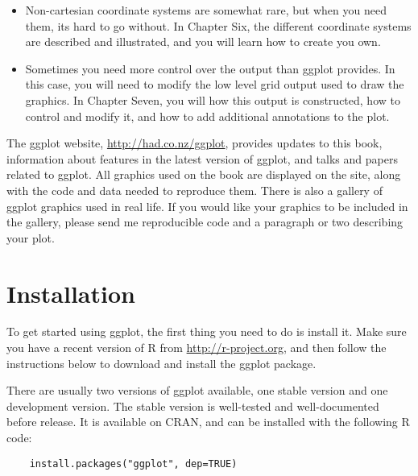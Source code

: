 \begin{itemize}
	\item Non-cartesian coordinate systems are somewhat rare, but when you need them, its hard to go without.  In Chapter Six, the different coordinate systems are described and illustrated, and you will learn how to create you own.
	
	
	\item Sometimes you need more control over the output than ggplot provides.  In this case, you will need to modify the low level grid output used to draw the graphics.  In Chapter Seven, you will how this output is constructed, how to control and modify it, and how to add additional annotations to the plot.

\end{itemize}

The ggplot website, \url{http://had.co.nz/ggplot}, provides updates to this book, information about features in the latest version of ggplot, and talks and papers related to ggplot.  All graphics used on the book are displayed on the site, along with the code and data needed to reproduce them.  There is also a gallery of ggplot graphics used in real life.  If you would like your graphics to be included in the gallery, please send me reproducible code and a paragraph or two describing your plot.

\section{Installation}\label{sub:installation}

To get started using ggplot, the first thing you need to do is install it.  Make sure you have a recent version of R from \url{http://r-project.org}, and then follow the instructions below to download and install the ggplot package.  

There are usually two versions of ggplot available, one stable version and one development version. The stable version is well-tested and well-documented before release.  It is available on CRAN, and can be installed with the following R code:

\begin{verbatim}
	install.packages("ggplot", dep=TRUE)
\end{verbatim}

